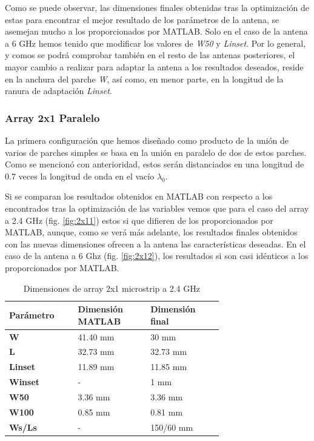 \par Como se puede observar, las dimensiones finales obtenidas tras la optimización de estas para encontrar el mejor resultado de los parámetros de la antena, se asemejan mucho a los proporcionados por MATLAB. Solo en el caso de la antena a 6 GHz hemos tenido que modificar los valores de \textit{W50} y \textit{Linset}. Por lo general, y comos se podrá comprobar también en el resto de las antenas posteriores, el mayor cambio a realizar para adaptar la antena a los resultados deseados, reside en la anchura del parche \textit{W}, así como, en menor parte, en la longitud de la ranura de adaptación \textit{Linset}.





\subsubsection{Array 2x1 Paralelo} 
\par La primera configuración que hemos diseñado como producto de la unión de varios de parches simples se basa en la unión en paralelo de dos de estos parches. Como se mencionó con anterioridad, estos serán distanciados en una longitud de 0.7 veces la longitud de onda en el vacío $\lambda_{0}$. 
\\
\par Si se comparan los resultados obtenidos en MATLAB con respecto a los encontrados tras la optimización de las variables vemos que para el caso del array a 2.4 GHz (fig. \ref{fig:2x11}) estos si que difieren de los proporcionados por MATLAB, aunque, como se verá más adelante, los resultados finales obtenidos con las nuevas dimensiones ofrecen a la antena las características deseadas. En el caso de la antena a 6 Ghz (fig. \ref{fig:2x12}), los resultados si son casi idénticos a los proporcionados por MATLAB.

\begin{table}[H]
  
   \label{tab:array2x11}
   \small %
   \centering %
   \begin{tabular}{m{0.2\linewidth}m{0.25\linewidth}m{0.25\linewidth}} %
   \toprule[\heavyrulewidth]\toprule[\heavyrulewidth]
   \textbf{Parámetro} & \textbf{Dimensión MATLAB} & \textbf{Dimensión final} \\ 
   \midrule
   \textbf{W} & 41.40 mm & 30 mm \\
   \textbf{L} & 32.73 mm & 32.73 mm\\
   \textbf{Linset} & 11.89 mm & 11.85 mm\\
   \textbf{Winset} & - & 1 mm\\
   \textbf{W50} & 3.36 mm & 3.36 mm\\
   \textbf{W100} & 0.85 mm & 0.81 mm\\
   \textbf{Ws/Ls} & - & 150/60 mm\\
   \bottomrule[\heavyrulewidth] 
   \end{tabular}
   \caption{Dimensiones de array 2x1 microstrip a 2.4 GHz} 
\end{table}

